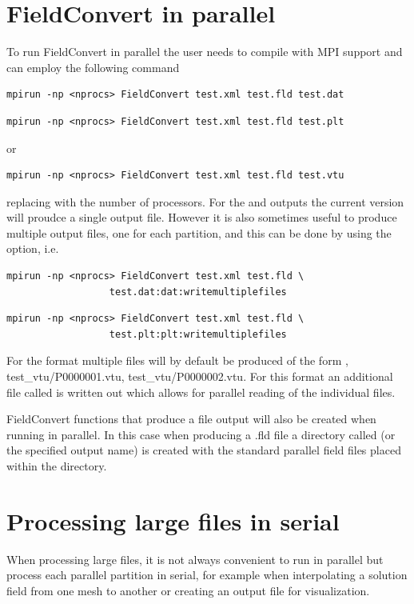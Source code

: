\section{FieldConvert in parallel}
To run FieldConvert in parallel the user needs to compile
\nekpp with MPI support and can employ the following
command
\begin{lstlisting}[style=BashInputStyle]
mpirun -np <nprocs> FieldConvert test.xml test.fld test.dat
\end{lstlisting}
\begin{lstlisting}[style=BashInputStyle]
mpirun -np <nprocs> FieldConvert test.xml test.fld test.plt
\end{lstlisting}
or
\begin{lstlisting}[style=BashInputStyle]
mpirun -np <nprocs> FieldConvert test.xml test.fld test.vtu
\end{lstlisting}
replacing  with the number of processors. For the
 and  outputs the current version will proudce
a single output file.  However it is also sometimes useful to produce
multiple output files, one for each partition, and this
can be done by using the  option, i.e.
\begin{lstlisting}[style=BashInputStyle]
  mpirun -np <nprocs> FieldConvert test.xml test.fld \
                  test.dat:dat:writemultiplefiles
\end{lstlisting}
\begin{lstlisting}[style=BashInputStyle]
  mpirun -np <nprocs> FieldConvert test.xml test.fld \
                  test.plt:plt:writemultiplefiles
\end{lstlisting}

For the  format multiple files will by default be produced
of the form , {test\_vtu/P0000001.vtu},
{test\_vtu/P0000002.vtu}. For this format an additional file called
\inltt{test.pvtu} is written out which allows for parallel reading of the
individual \inltt{.vtu} files.

FieldConvert functions that produce a  file output will
also be created when running in parallel. In this case when producing
a .fld file a directory called \inltt{test.fld} (or the specified
output name) is created with the standard parallel field files placed
within the directory.
%
%
%
\section{Processing large files in serial}
When processing large files, it is not always convenient to run in parallel but
process each parallel partition in serial, for example when interpolating a
solution field from one mesh to another or creating an output file for
visualization.


